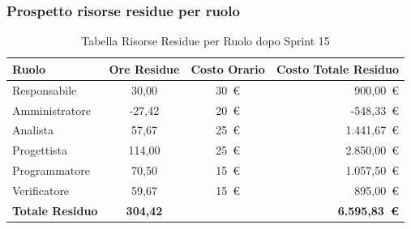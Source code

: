 \subsubsection{Prospetto risorse residue per ruolo}
\begin{table}[H]
    \centering
    \renewcommand{\arraystretch}{1.3}
    \begin{tabularx}{\textwidth}{|X|c|c|r|}
        \hline
        \textbf{Ruolo} & \textbf{Ore Residue} & \textbf{Costo Orario} &
        \textbf{Costo Totale Residuo} \\
        \hline
        Responsabile   & 30,00 & 30~\euro & 900{,}00~\euro \\
        Amministratore & -27,42 & 20~\euro & -548{,}33~\euro \\
        Analista       & 57,67 & 25~\euro & 1.441{,}67~\euro \\
        Progettista    & 114,00 & 25~\euro & 2.850{,}00~\euro \\
        Programmatore  & 70,50 & 15~\euro & 1.057{,}50~\euro \\
        Verificatore   & 59,67 & 15~\euro & 895{,}00~\euro \\
        \hline
        \textbf{Totale Residuo} & \textbf{304,42} & &
        \textbf{6.595{,}83~\euro} \\
        \hline
    \end{tabularx}
    \caption{Tabella Risorse Residue per Ruolo dopo Sprint 15}
\end{table}


